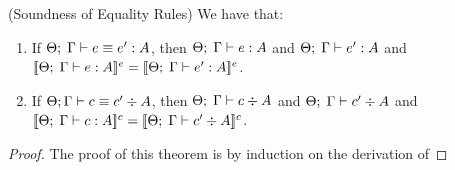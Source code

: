 \begin{lemma}{(Soundness of Equality Rules)}
We have that:
\begin{enumerate}
\item If ${\Theta};\;{\Gamma} \vdash {e} \equiv {e'} : {A}$, then ${\Theta};\;{\Gamma} \vdash {e} : {A}$ and 
${\Theta};\;{\Gamma} \vdash {e'} : {A}$ and 
$[\![{{\Theta};\;{\Gamma} \vdash {e} : {A}}]\!]^e = [\![{{\Theta};\;{\Gamma} \vdash {e'} : {A}}]\!]^e$.

\item If ${\Theta};{\Gamma} \vdash {c} \equiv {c'} \div {A}$, then ${\Theta};\;{\Gamma} \vdash {c} \div {A}$ and 
${\Theta};\;{\Gamma} \vdash {c'} \div {A}$ and 
$[\![{{\Theta};\;{\Gamma} \vdash {c} : {A}}]\!]^c = [\![{{\Theta};\;{\Gamma} \vdash {c'} \div {A}}]\!]^c$.
\end{enumerate}
\end{lemma}


\begin{proof}
The proof of this theorem is by induction on the derivation of 
\end{proof}
